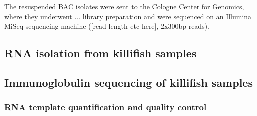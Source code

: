 
The resuspended BAC isolates were sent to the Cologne Center for Genomics, where they underwent ... library preparation and were sequenced on an Illumina MiSeq sequencing machine ([read length etc here], 2x300bp reads). %

\subsection{RNA isolation from killifish samples}


\subsection{Immunoglobulin sequencing of killifish samples}
\label{sec:methods_molec_igseq}

\subsubsection{RNA template quantification and quality control}
\label{sec:methods_molec_igseq_template}

